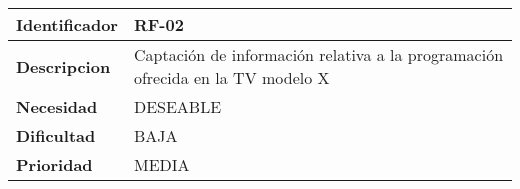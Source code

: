 \begin{center}
    \begin{tabular}{|p{2.6cm}|p{12cm}|}
    \hline
    \textbf{Identificador} & RF-02\\
    \hline
    \textbf{Descripcion} & Captación de información relativa a la programación ofrecida en la TV modelo X\\
    \hline
    \textbf{Necesidad} & DESEABLE\\
    \hline
    \textbf{Dificultad} & BAJA\\
    \hline
    \textbf{Prioridad} & MEDIA\\
    \hline
    \end{tabular}
\end{center}
